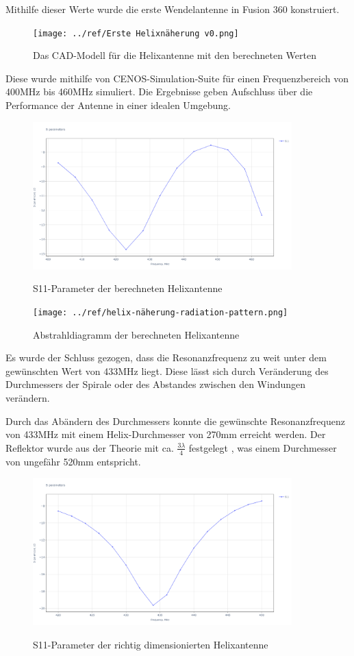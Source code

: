 Mithilfe dieser Werte wurde die erste Wendelantenne in Fusion 360 konstruiert. 

\begin{figure}[h!]
	\centering
	\texttt{[image: ../ref/Erste Helixnäherung v0.png]}
	\label{fig:ersteHelixnäherung}
	\caption{Das CAD-Modell für die Helixantenne mit den berechneten Werten}
\end{figure}

Diese wurde mithilfe von CENOS-Simulation-Suite für einen Frequenzbereich von 400MHz bis 460MHz simuliert. Die Ergebnisse geben Aufschluss über die Performance der Antenne in einer idealen Umgebung.

\begin{figure}[h!]
	\centering
	\includegraphics[width=10cm]{../ref/helix-naherung-S11.png}
	\label{fig:ersteHelixnäherung-S11}
	\caption{S11-Parameter der berechneten Helixantenne}
\end{figure}

\begin{figure}[h!]
	\centering
	\texttt{[image: ../ref/helix-näherung-radiation-pattern.png]}
	\label{fig:ersteHelixnäherung-abstrahldiagramm}
	\caption{Abstrahldiagramm der berechneten Helixantenne}
\end{figure}

Es wurde der Schluss gezogen, dass die Resonanzfrequenz zu weit unter dem gewünschten Wert von 433MHz liegt. Diese lässt sich durch Veränderung des Durchmessers der Spirale oder des Abstandes zwischen den Windungen verändern.

Durch das Abändern des Durchmessers konnte die gewünschte Resonanzfrequenz von 433MHz mit einem Helix-Durchmesser von 270mm erreicht werden. Der Reflektor wurde aus der Theorie mit ca. $\frac{3\lambda}{4}$ festgelegt \cite{Kraus-2002-AntennasB}, was einem Durchmesser von ungefähr 520mm entspricht.

\begin{figure}[H]
	\centering
	\includegraphics[width=10cm]{../ref/helix-fertig-S11.png}
	\label{fig:fertigeHelix-S11}
	\caption{S11-Parameter der richtig dimensionierten Helixantenne}
\end{figure}

